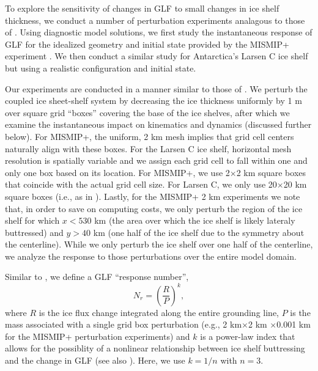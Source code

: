 \documentclass[review,oneside]{igs}
\begin{document}
To explore the sensitivity of changes in GLF to small changes in ice shelf thickness, we conduct a number of perturbation experiments analagous to those of \citet{reese2018}. Using diagnostic model solutions, we first study the instantaneous response of GLF for the idealized geometry and initial state provided by the MISMIP+ experiment \citep{asay2016}. We then conduct a similar study for Antarctica's Larsen C ice shelf but using a realistic configuration and initial state. %

Our experiments are conducted in a manner similar to those of \cite{reese2018}. We perturb the coupled ice sheet-shelf system by decreasing the ice thickness uniformly by 1 m over square grid ``boxes'' covering the base of the ice shelves, after which we examine the instantaneous impact on kinematics and dynamics (discussed further below). For MISMIP+, the uniform, 2 km mesh implies that grid cell centers naturally align with these boxes. For the Larsen C ice shelf, horizontal mesh resolution is spatially variable and we assign each grid cell to fall within one and only one box based on its location. For MISMIP+, we use 2$\times$2 km square boxes that coincide with the actual grid cell size. For Larsen C, we only use 20$\times$20 km square boxes (i.e., as in \citet{reese2018}). Lastly, for the MISMIP+ 2 km experiments we note that, in order to save on computing costs, we only perturb the region of the ice shelf for which $x<530$ km (the area over which the ice shelf is likely lateraly buttressed) and $y>40$ km (one half of the ice shelf due to the symmetry about the centerline). While we only perturb the ice shelf over one half of the centerline, we analyze the response to those perturbations over the entire model domain. 

Similar to \cite{reese2018}, we define a GLF ``response number'',
\begin{equation}
N_r = \left(\frac{R}{P}\right)^k,
\end{equation}
where $R$ is the ice flux change integrated along the entire grounding line, $P$ is the mass associated with a single grid box perturbation (e.g., 2 km$\times$2 km $\times$0.001 km for the MISMIP+ perturbation experiments) and $k$ is a power-law index that allows for the possiblity of a nonlinear relationship between ice shelf buttressing and the change in GLF (see also \cite{schoof2007}). Here, we use $k=1/n$ with $n=3$.
\end{document}
